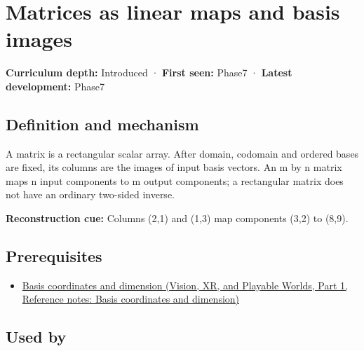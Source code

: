 \hypertarget{appendix-bd39c3bf5d64}{}\label{referencestart:appendix-bd39c3bf5d64}
\section{Matrices as linear maps and basis images}\label{appendix-bd39c3bf5d64-matrices-as-linear-maps-and-basis-images}

\hypertarget{appendix-bd39c3bf5d64-matrices-as-linear-maps-and-basis-images}{}

\textbf{Curriculum depth:} Introduced · \textbf{First seen:} Phase7 · \textbf{Latest development:} Phase7

\begin{allmightroledefinition}

\subsection{Definition and mechanism}\label{appendix-bd39c3bf5d64-definition-and-mechanism}

\hypertarget{appendix-bd39c3bf5d64-definition-and-mechanism}{}

A matrix is a rectangular scalar array. After domain, codomain and ordered bases are fixed, its columns are the images of input basis vectors. An m by n matrix maps n input components to m output components; a rectangular matrix does not have an ordinary two-sided inverse.

\end{allmightroledefinition}

\textbf{Reconstruction cue:} Columns (2,1) and (1,3) map components (3,2) to (8,9).

\subsection{Prerequisites}\label{appendix-bd39c3bf5d64-prerequisites}

\hypertarget{appendix-bd39c3bf5d64-prerequisites}{}

\begin{itemize}
\tightlist
\item
  \href{../07-Vision-XR-and-Playable-Worlds-P01/main.pdf\#nameddest=appendix-ce0341f7ea0d}{Basis coordinates and dimension (Vision, XR, and Playable Worlds, Part 1, Reference notes: Basis coordinates and dimension)}
\end{itemize}

\subsection{Used by}\label{appendix-bd39c3bf5d64-used-by}

